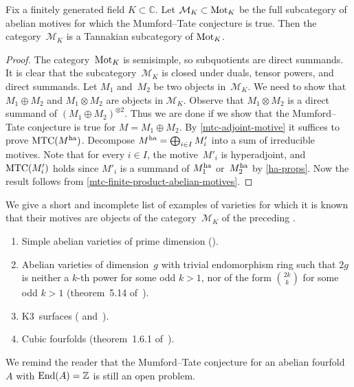 \documentclass[10pt,twoside,leqno]{article}
\numberwithin{equation}{subsection}
\newcommand{\End}{\textnormal{End}}
\newcommand{\ZZ}{\mathbb{Z}}
\newcommand{\CC}{\mathbb{C}}
\newcommand{\ha}{\textnormal{ha}}
\newcommand{\Mot}{\textnormal{Mot}}
\newcommand{\MTC}{\textnormal{MTC}}
\begin{document}
\begin{theorem} %
	\label{mtc-abelian-motives-tannakian-subcategory}
	Fix a finitely generated field $K \subset \CC$.
	Let $\mathcal{M}_K \subset \Mot_K$ be the full subcategory
	of abelian motives for which the Mumford--Tate conjecture is true.
	Then the category~$\mathcal{M}_K$ is a Tannakian subcategory of $\Mot_K$.
	\begin{proof}
		The category~$\Mot_K$ is semisimple,
		so subquotients are direct summands.
		It is clear that the subcategory~$\mathcal{M}_K$
		is closed under duals, tensor powers, and direct summands.
		Let $M_1$ and~$M_2$ be two objects in~$\mathcal{M}_K$.
		We need to show that $M_1 \oplus M_2$
		and $M_1 \otimes M_2$ are objects in $\mathcal{M}_K$.
		Observe that $M_1 \otimes M_2$ is a direct summand of
		$(M_1 \oplus M_2)^{\otimes 2}$.
		Thus we are done if we show that the Mumford--Tate conjecture is true for
		$M = M_1 \oplus M_2$.
		By \cref{mtc-adjoint-motive} it suffices to prove $\MTC(M^\ha)$.
		Decompose $M^\ha = \bigoplus_{i \in I} M'_i$
  into a sum of irreducible motives.
  Note that for every $i \in I$, the motive~$M'_i$ is hyperadjoint,
  and $\MTC(M'_i)$ holds
  since $M'_i$ is a summand of $M_1^\ha$ or~$M_2^\ha$ by \cref{ha-props}.
		Now the result follows from \cref{mtc-finite-product-abelian-motives}.
	\end{proof}
\end{theorem}

\begin{remark} %
 We give a short and incomplete list of examples of varieties
 for which it is known that their motives
 are objects of the category~$\mathcal{M}_K$
 of the preceding .
 \begin{enumerate}
  \item Simple abelian varieties of prime dimension (). %
  \item Abelian varieties of dimension~$g$ with trivial endomorphism ring
   such that $2g$ is neither a $k$-th power for some odd $k > 1$,
   nor of the form $\binom{2k}{k}$ for some odd $k > 1$
   (theorem~5.14 of~\cite{Pi98}).
  \item K3~surfaces (\cite{MTCK3I} and~\cite{MTCK3II}).
  \item Cubic fourfolds (theorem~1.6.1 of~\cite{An96}).
 \end{enumerate}
 We remind the reader that the Mumford--Tate conjecture
 for an abelian fourfold~$A$ with $\End(A) = \ZZ$
 is still an open problem.
\end{remark}
\end{document}
